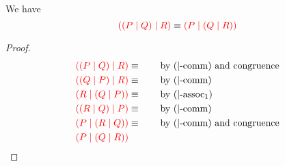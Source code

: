 \begin{lemma}[\ncEquivPoolAssNoParen2]\label{thm:nc-pool-assoc2}
  We have
  \[
    \textcolor{red}{((P \mid Q) \mid R)} \equiv
    \textcolor{red}{(P \mid (Q \mid R))}
  \]
\end{lemma}
\begin{proof}
  \begin{align*}
    \tm{\ncPool{\ncPool{P}{Q}}{R}} &\equiv \qquad \text{by \ncEquivPoolComm and congruence} \\
    \tm{\ncPool{\ncPool{Q}{P}}{R}} &\equiv \qquad \text{by \ncEquivPoolComm} \\
    \tm{\ncPool{R}{\ncPool{Q}{P}}} &\equiv \qquad \text{by \ncEquivPoolAss1} \\
    \tm{\ncPool{\ncPool{R}{Q}}{P}} &\equiv \qquad \text{by \ncEquivPoolComm} \\
    \tm{\ncPool{P}{\ncPool{R}{Q}}} &\equiv \qquad \text{by \ncEquivPoolComm and congruence} \\
    \tm{\ncPool{P}{\ncPool{Q}{R}}}
  \end{align*}
\end{proof}
